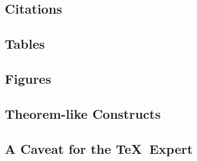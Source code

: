 \subsection{Citations}
\subsection{Tables}
\subsection{Figures}
\subsection{Theorem-like Constructs}
\subsection*{A {\secit Caveat} for the \TeX\ Expert}
